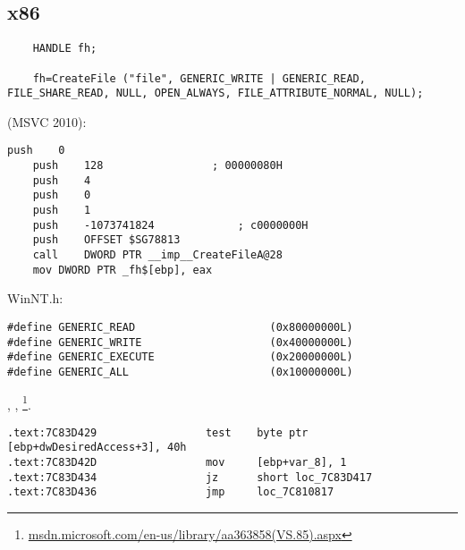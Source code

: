 \subsection{x86}


\begin{lstlisting}
	HANDLE fh;

	fh=CreateFile ("file", GENERIC_WRITE | GENERIC_READ, FILE_SHARE_READ, NULL, OPEN_ALWAYS, FILE_ATTRIBUTE_NORMAL, NULL);
\end{lstlisting}

 (MSVC 2010):

\begin{lstlisting}[caption=MSVC 2010]
	push	0
	push	128					; 00000080H
	push	4
	push	0
	push	1
	push	-1073741824				; c0000000H
	push	OFFSET $SG78813
	call	DWORD PTR __imp__CreateFileA@28
	mov	DWORD PTR _fh$[ebp], eax
\end{lstlisting}

 WinNT.h:

\begin{lstlisting}[caption=WinNT.h]
#define GENERIC_READ                     (0x80000000L)
#define GENERIC_WRITE                    (0x40000000L)
#define GENERIC_EXECUTE                  (0x20000000L)
#define GENERIC_ALL                      (0x10000000L)
\end{lstlisting}

, 
, 
 \footnote{\href{http://go.yurichev.com/17065}{msdn.microsoft.com/en-us/library/aa363858(VS.85).aspx}}.


\begin{lstlisting}[caption=KERNEL32.DLL (Windows XP SP3 x86)]
.text:7C83D429                 test    byte ptr [ebp+dwDesiredAccess+3], 40h
.text:7C83D42D                 mov     [ebp+var_8], 1
.text:7C83D434                 jz      short loc_7C83D417
.text:7C83D436                 jmp     loc_7C810817
\end{lstlisting}

